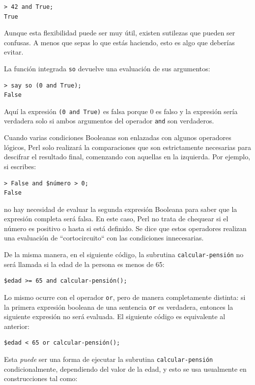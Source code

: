 \begin{verbatim}
> 42 and True;
True
\end{verbatim}
%
Aunque esta flexibilidad puede ser muy útil, existen 
sutilezas que pueden ser confusas. A menos que sepas
lo que estás haciendo, esto es algo que deberías evitar.

La función integrada {\tt so} devuelve una evaluación 
de sus argumentos:

\begin{verbatim}
> say so (0 and True);
False
\end{verbatim}
%
Aquí la expresión {\tt (0 and True)} es falsa porque 0 es falso
y la expresión sería verdadera solo si ambos argumentos del operador
{\tt and} son verdaderos.

Cuando varias condiciones Booleanas son enlazadas con algunos
operadores lógicos, Perl solo realizará la comparaciones que son
estrictamente necesarias para descifrar el resultado final,
comenzando con aquellas en la izquierda. Por ejemplo, si escribes:

\begin{verbatim}
> False and $número > 0;
False
\end{verbatim}
%
no hay necesidad de evaluar la segunda expresión Booleana
para saber que la expresión completa será falsa. En este caso,
Perl no trata de chequear si el número es positivo o hasta si
está definido. Se dice que estos operadores realizan una evaluación
de ``cortocircuito`` con las condiciones innecesarias.

De la misma manera, en el siguiente código, la subrutina 
{\tt calcular-pensión} no será llamada si la edad de la persona
es menos de 65:

\begin{verbatim}
$edad >= 65 and calcular-pensión();
\end{verbatim}
%
Lo mismo ocurre con el operador {\tt or}, pero de
manera completamente distinta: si la primera expresión booleana
de una sentencia {\tt or} es verdadera, entonces la siguiente
expresión no será evaluada. El siguiente código es equivalente
al anterior:

\begin{verbatim}
$edad < 65 or calcular-pensión();
\end{verbatim}
% 
Esta \emph{puede} ser una forma de ejecutar la subrutina
{\tt calcular-pensión} condicionalmente, dependiendo del 
valor de la edad, y esto se usa usualmente en construcciones
tal como:

